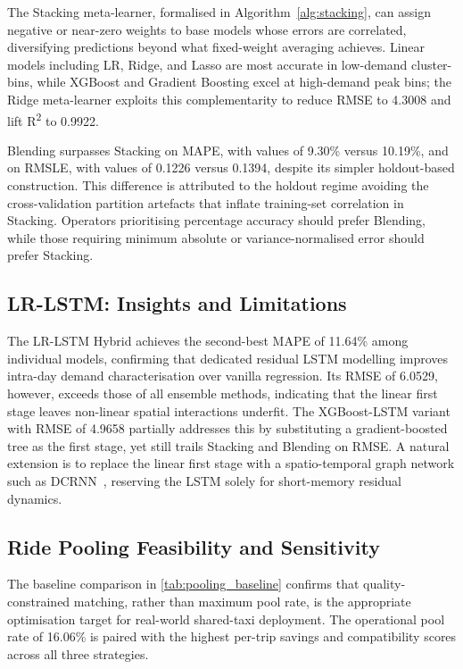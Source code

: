 The Stacking meta-learner, formalised in Algorithm~\ref{alg:stacking}, can assign negative or near-zero weights to base models whose errors are correlated, diversifying predictions beyond what fixed-weight averaging achieves. Linear models including LR, Ridge, and Lasso are most accurate in low-demand cluster-bins, while XGBoost and Gradient Boosting excel at high-demand peak bins; the Ridge meta-learner exploits this complementarity to reduce RMSE to 4.3008 and lift R\textsuperscript{2} to 0.9922.

Blending surpasses Stacking on MAPE, with values of 9.30\% versus 10.19\%, and on RMSLE, with values of 0.1226 versus 0.1394, despite its simpler holdout-based construction. This difference is attributed to the holdout regime avoiding the cross-validation partition artefacts that inflate training-set correlation in Stacking. Operators prioritising percentage accuracy should prefer Blending, while those requiring minimum absolute or variance-normalised error should prefer Stacking.

\subsection{LR-LSTM: Insights and Limitations}

The LR-LSTM Hybrid achieves the second-best MAPE of 11.64\% among individual models, confirming that dedicated residual LSTM modelling improves intra-day demand characterisation over vanilla regression. Its RMSE of 6.0529, however, exceeds those of all ensemble methods, indicating that the linear first stage leaves non-linear spatial interactions underfit. The XGBoost-LSTM variant with RMSE of 4.9658 partially addresses this by substituting a gradient-boosted tree as the first stage, yet still trails Stacking and Blending on RMSE. A natural extension is to replace the linear first stage with a spatio-temporal graph network such as DCRNN~\parencite{li2018diffusion}, reserving the LSTM solely for short-memory residual dynamics.

\subsection{Ride Pooling Feasibility and Sensitivity}

The baseline comparison in \autoref{tab:pooling_baseline} confirms that quality-constrained matching, rather than maximum pool rate, is the appropriate optimisation target for real-world shared-taxi deployment. The operational pool rate of 16.06\% is paired with the highest per-trip savings and compatibility scores across all three strategies.

